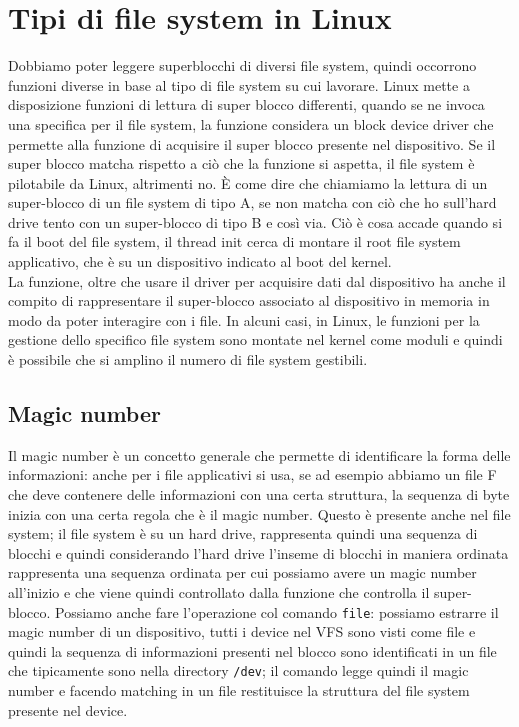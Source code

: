 \documentclass[12pt, oneside]{extbook}
\begin{document}
\section{Tipi di file system in Linux}
Dobbiamo poter leggere superblocchi di diversi file system, quindi occorrono funzioni diverse in base al tipo di file system su cui lavorare. Linux mette a disposizione funzioni di lettura di super blocco differenti, quando se ne invoca una specifica per il file system, la funzione considera un block device driver che permette alla funzione di acquisire il super blocco presente nel dispositivo. Se il super blocco matcha rispetto a ciò che la funzione si aspetta, il file system è pilotabile da Linux, altrimenti no. È come dire che chiamiamo la lettura di un super-blocco di un file system di tipo A, se non matcha con ciò che ho sull'hard drive tento con un super-blocco di tipo B e così via. Ciò è cosa accade quando si fa il boot del file system, il thread init cerca di montare il root file system applicativo, che è su un dispositivo indicato al boot del kernel.\\La funzione, oltre che usare il driver per acquisire dati dal dispositivo ha anche il compito di rappresentare il super-blocco associato al dispositivo in memoria in modo da poter interagire con i file. In alcuni casi, in Linux, le funzioni per la gestione dello specifico file system sono montate nel kernel come moduli e quindi è possibile che si amplino il numero di file system gestibili.
\subsection{Magic number}
Il magic number è un concetto generale che permette di identificare la forma delle informazioni: anche per i file applicativi si usa, se ad esempio abbiamo un file F che deve contenere delle informazioni con una certa struttura, la sequenza di byte inizia con una certa regola che è il magic number. Questo è presente anche nel file system; il file system è su un hard drive, rappresenta quindi una sequenza di blocchi e quindi considerando l'hard drive l'inseme di blocchi in maniera ordinata rappresenta una sequenza ordinata per cui possiamo avere un magic number all'inizio e che viene quindi controllato dalla funzione che controlla il super-blocco. Possiamo anche fare l'operazione col comando \texttt{file}: possiamo estrarre il magic number di un dispositivo, tutti i device nel VFS sono visti come file e quindi la sequenza di informazioni presenti nel blocco sono identificati in un file che tipicamente sono nella directory \texttt{/dev}; il comando legge quindi il magic number e facendo matching in un file restituisce la struttura del file system presente nel device.
\end{document}
